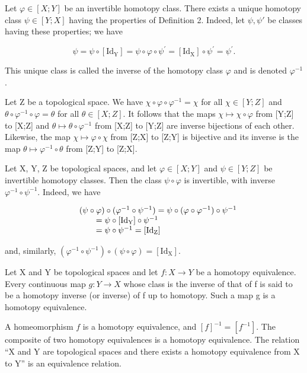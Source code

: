Let \(\varphi\in[X;Y]\) be an invertible homotopy class. There exists a unique homotopy class \(\psi\in[Y;X]\) having the properties of Definition 2. Indeed, let \(\psi,\psi'\) be classes having these properties; we have

\[
\psi = \psi \circ [ \mathrm{Id} _ {\mathrm{Y}} ] = \psi \circ \varphi \circ \psi^ {\prime} = [ \mathrm{Id} _ {\mathrm{X}} ] \circ \psi^ {\prime} = \psi^ {\prime}.
\]

This unique class is called the inverse of the homotopy class \(\varphi\) and is denoted \(\varphi^{-1}\).

Let Z be a topological space. We have \(\chi\circ\varphi\circ\varphi^{-1}=\chi\) for all \(\chi\in[Y;Z]\) and \(\theta\circ\varphi^{-1}\circ\varphi=\theta\) for all \(\theta\in[X;Z].\) It follows that the maps \(\chi\mapsto\chi\circ\varphi\) from {[}Y;Z{]} to {[}X;Z{]} and \(\theta\mapsto\theta\circ\varphi^{-1}\) from {[}X;Z{]} to {[}Y;Z{]} are inverse bijections of each other. Likewise, the map \(\chi\mapsto\varphi\circ\chi\) from {[}Z;X{]} to {[}Z;Y{]} is bijective and its inverse is the map \(\theta\mapsto\varphi^{-1}\circ\theta\) from {[}Z;Y{]} to {[}Z;X{]}.

Let X, Y, Z be topological spaces, and let \(\varphi \in [X;Y]\) and \(\psi \in [Y;Z]\) be invertible homotopy classes. Then the class \(\psi \circ \varphi\) is invertible, with inverse \(\varphi^{-1} \circ \psi^{-1}\). Indeed, we have

\[
\begin{array}{r l} & (\psi \circ \varphi) \circ (\varphi^ {- 1} \circ \psi^ {- 1}) = \psi \circ (\varphi \circ \varphi^ {- 1}) \circ \psi^ {- 1} \\ & \qquad = \psi \circ [ \mathrm{Id} _ {\mathrm{Y}} ] \circ \psi^ {- 1} \\ & \qquad = \psi \circ \psi^ {- 1} = [ \mathrm{Id} _ {\mathrm{Z}} ] \end{array}
\]

and, similarly, \((\varphi^{-1} \circ \psi^{-1}) \circ (\psi \circ \varphi) = [\mathrm{Id}_{\mathrm{X}}]\).

Let X and Y be topological spaces and let \(f: X \to Y\) be a homotopy equivalence. Every continuous map \(g: Y \to X\) whose class is the inverse of that of f is said to be a homotopy inverse (or inverse) of f up to homotopy. Such a map g is a homotopy equivalence.

A homeomorphism \(f\) is a homotopy equivalence, and \([f]^{-1} = [f^{-1}]\). The composite of two homotopy equivalences is a homotopy equivalence. The relation “X and Y are topological spaces and there exists a homotopy equivalence from X to Y” is an equivalence relation.

